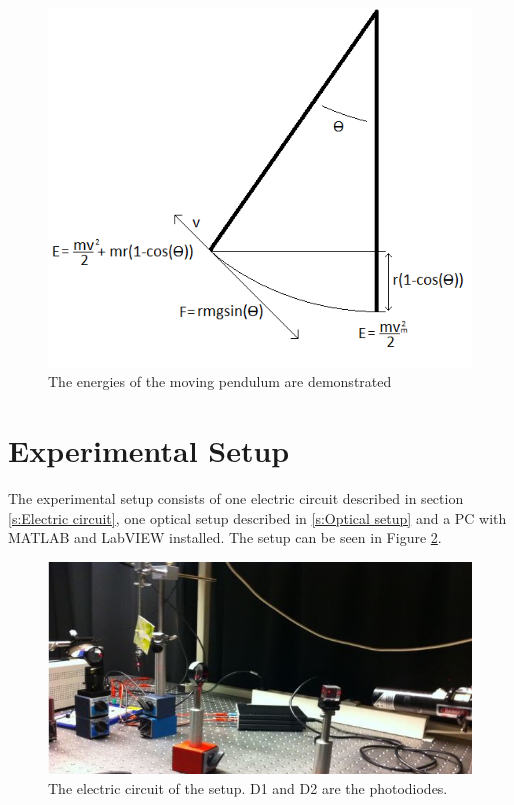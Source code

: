 \documentclass[11pt, a4paper]{article}
\begin{document}
\begin{figure}[h]
	\centering
	\includegraphics{pendulummotion}
	\caption{The energies of the moving pendulum are demonstrated}
	\label{f:pendulummotion}
\end{figure}

\section{Experimental Setup}
The experimental setup consists of one electric circuit described in section \ref{s:Electric circuit}, one optical setup described in \ref{s:Optical setup} and a PC with MATLAB and LabVIEW installed. 
The setup can be seen in Figure \ref{f:setup}. 

\begin{figure}[h]
	\centering
	\includegraphics{setup}
	\caption{The electric circuit of the setup. D1 and D2 are the photodiodes.}
	\label{f:setup}
\end{figure}
\end{document}
